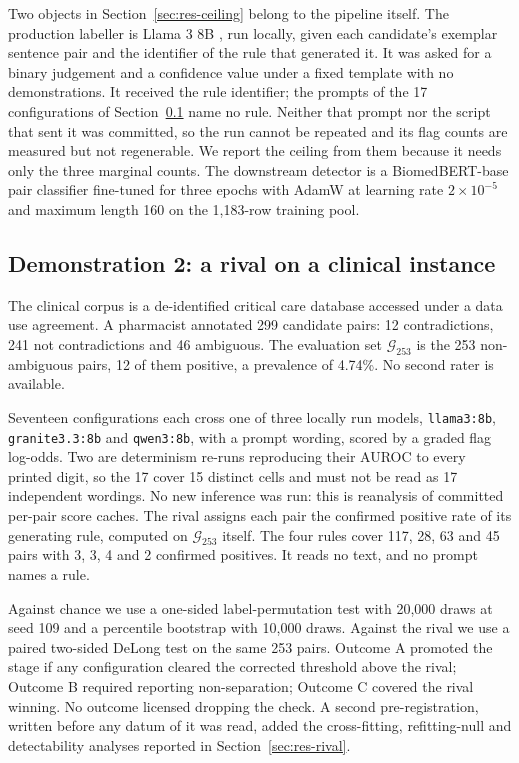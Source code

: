 \documentclass[review]{elsarticle}
\begin{document}
Two objects in Section~\ref{sec:res-ceiling} belong to the pipeline itself. The production labeller is Llama 3 8B \cite{grattafiori2024llama3}, run
locally, given each candidate's exemplar sentence pair and the identifier of the rule that generated it. It was asked for a binary
judgement and a confidence value under a fixed template with no demonstrations. It received the rule identifier;
the prompts of the 17 configurations of Section~\ref{sec:mat-d2} name no rule.
Neither that prompt nor the script that sent it was committed, so the run cannot
be repeated and its flag counts are measured but not regenerable. We report the
ceiling from them because it needs only the three marginal counts. The downstream
detector is a BiomedBERT-base pair classifier \cite{gu2021domainspecific}
fine-tuned for three epochs with AdamW at learning rate $2\times10^{-5}$ and
maximum length 160 on the 1,183-row training pool.

\subsection{Demonstration 2: a rival on a clinical instance}
\label{sec:mat-d2}

The clinical corpus is a de-identified critical care database
\cite{johnson2016mimic} accessed under a data use agreement. A pharmacist
annotated 299 candidate pairs: 12 contradictions, 241 not contradictions and 46
ambiguous. The evaluation set $\mathcal{G}_{253}$ is the 253 non-ambiguous pairs,
12 of them positive, a prevalence of 4.74\%. No second rater is available.

Seventeen configurations each cross one of three locally run models,
\texttt{llama3\discretionary{}{}{}:8b}, \texttt{granite3.3\discretionary{}{}{}:8b} and \texttt{qwen3\discretionary{}{}{}:8b}, with a prompt
wording, scored by a
graded flag log-odds. Two are determinism re-runs reproducing their AUROC to every printed digit, so
the 17 cover 15 distinct cells and must not be read as 17 independent wordings. No new inference was run: this is
reanalysis of committed per-pair score caches. The rival assigns each pair the
confirmed positive rate of its generating rule, computed on
$\mathcal{G}_{253}$ itself. The four rules cover 117, 28, 63 and 45 pairs with
3, 3, 4 and 2 confirmed positives. It reads no text, and no prompt names a rule.

Against chance we use a one-sided label-permutation test with 20,000 draws at
seed 109 and a percentile bootstrap with 10,000 draws. Against the rival
we use a paired two-sided DeLong test \cite{delong1988comparing} on the same 253
pairs. Outcome A promoted the stage if any configuration cleared the corrected
threshold above the rival; Outcome B required reporting non-separation; Outcome C covered the rival winning. No
outcome licensed dropping the check. A second pre-registration, written before
any datum of it was read, added the cross-fitting, refitting-null and
detectability analyses reported in Section~\ref{sec:res-rival}.
\end{document}
